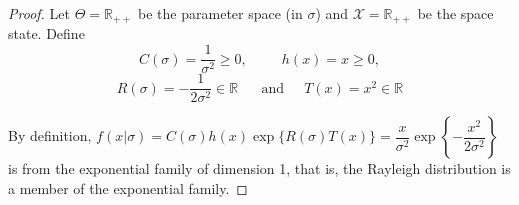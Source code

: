 \begin{proof}
    Let $\Theta = \mathbb{R}_{++}$ be the parameter space (in $\sigma$) and $\mathcal{X} =
    \mathbb{R}_{++}$ be the space state. Define 
    $$C(\sigma) = \frac{1}{\sigma^2} \ge 0, ~~~~~~~~~~~h(x) = x \ge 0,$$
    $$R(\sigma) = -\frac{1}{2\sigma^2} \in \mathbb{R} ~~~~~~ \text{ and } ~~~~~T(x) = x^2 \in \mathbb{R}$$

    By definition, $f(x|\sigma) = C(\sigma)h(x)\exp\{R(\sigma)T(x)\} =
    \dfrac{x}{\sigma^2}\exp\left\{-\dfrac{x^2}{2\sigma^2}\right\}$ is from the
    exponential family of dimension 1, that is, the Rayleigh distribution is a
    member of the exponential family. 
\end{proof}